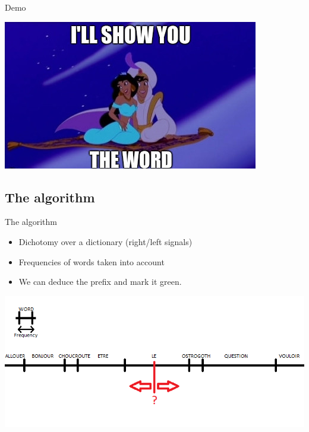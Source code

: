 \documentclass[graphics]{beamer}
\begin{document}
\begin{frame}{Demo}
	\begin{center}
		\includegraphics[scale=0.6]{aladdin}
	\end{center}
\end{frame}

\subsection{The algorithm}

\begin{frame}{The algorithm}
	\begin{center}
		\begin{itemize}
			\item Dichotomy over a dictionary (right/left signals)
			\item Frequencies of words taken into account
			\item We can deduce the prefix and mark it green.
		\end{itemize}
		\includegraphics[scale=0.4]{algo}
	\end{center}
\end{frame}
\end{document}
